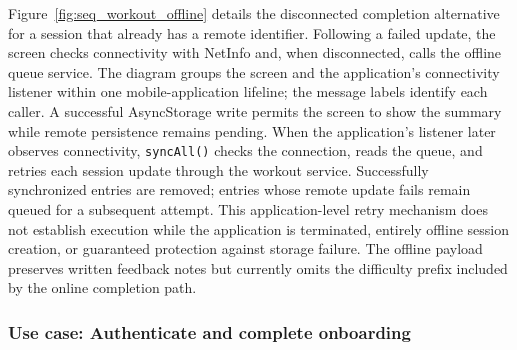 \documentclass[12pt,a4paper,openany]{report}
\begin{document}
Figure~\ref{fig:seq_workout_offline} details the disconnected completion alternative for a session that already has a remote identifier. Following a failed update, the screen checks connectivity with NetInfo and, when disconnected, calls the offline queue service. The diagram groups the screen and the application's connectivity listener within one mobile-application lifeline; the message labels identify each caller. A successful AsyncStorage write permits the screen to show the summary while remote persistence remains pending. When the application's listener later observes connectivity, \texttt{syncAll()} checks the connection, reads the queue, and retries each session update through the workout service. Successfully synchronized entries are removed; entries whose remote update fails remain queued for a subsequent attempt. This application-level retry mechanism does not establish execution while the application is terminated, entirely offline session creation, or guaranteed protection against storage failure. The offline payload preserves written feedback notes but currently omits the difficulty prefix included by the online completion path.


\subsubsection{Use case: Authenticate and complete onboarding}
\end{document}
